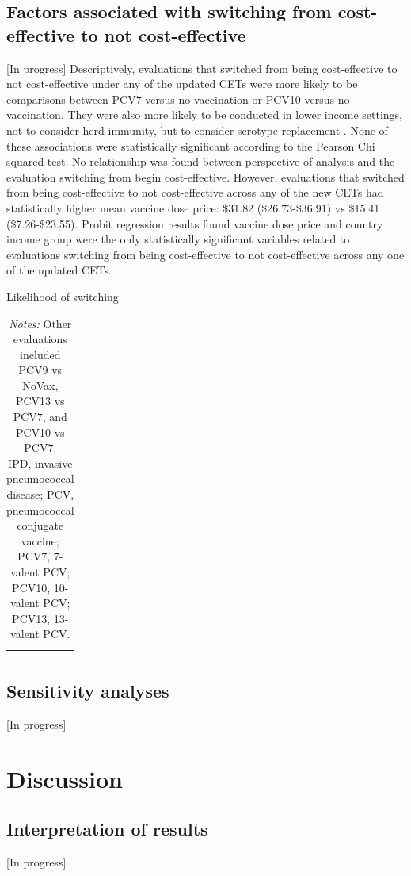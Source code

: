 \documentclass[12pt]{article}
\begin{document}
\subsection{Factors associated with switching from cost-effective to not cost-effective}
[In progress]
Descriptively, evaluations that switched from being cost-effective to not cost-effective under any of the updated CETs were more likely to be comparisons between PCV7 versus no vaccination or PCV10 versus no vaccination. They were also more likely to be conducted in lower income settings, not to consider herd immunity, but to consider serotype replacement . None of these associations were statistically significant according to the Pearson Chi squared test. No relationship was found between perspective of analysis and the evaluation switching from begin cost-effective. However, evaluations that switched from being cost-effective to not cost-effective across any of the new CETs had statistically higher mean vaccine dose price: \$31.82 (\$26.73-\$36.91) vs \$15.41 (\$7.26-\$23.55).  Probit regression results found vaccine dose price and country income group were the only statistically significant variables related to evaluations switching from being cost-effective to not cost-effective across any one of the updated CETs.




\begin{table}[H]
    \centering \singlespacing \small
    \caption{Likelihood of switching}
    \begin{tabular}{|L{4.5cm}|L{4cm}|C{2.75cm}|C{2.75cm}|}
        \hline
    \end{tabular}
    \label{tab_likely_anyswitch}
    \caption*{\footnotesize \textit{Notes:} Other evaluations included PCV9 vs NoVax, PCV13 vs PCV7, and PCV10 vs PCV7. \\
    IPD, invasive pneumococcal disease; PCV, pneumococcal conjugate vaccine; PCV7, 7-valent PCV; PCV10, 10-valent PCV; PCV13, 13-valent PCV. 
}
\end{table}


\subsection{Sensitivity analyses}
[In progress]


\section{Discussion}
\subsection{Interpretation of results}
[In progress]
\end{document}
